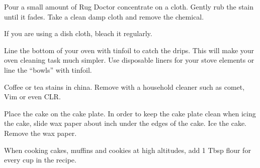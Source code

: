  \par
\begin{minipage}{\linewidth}
Pour a small amount of Rug Doctor concentrate on a cloth. Gently rub the stain until it fades. Take a clean damp cloth and remove the chemical.
\end{minipage}\par

\begin{minipage}{\linewidth}
\end{minipage}\par

\begin{minipage}{\linewidth}
If you are using a dish cloth, bleach it regularly.
\end{minipage}\par

\begin{minipage}{\linewidth}
Line the bottom of your oven with tinfoil to catch the drips. This will make your oven cleaning task much simpler.
Use disposable liners for your stove elements or line the ``bowls'' with tinfoil.
\end{minipage}\par

\begin{minipage}{\linewidth}
Coffee or tea stains in china. Remove with a household cleaner such as comet, Vim or even CLR.
\end{minipage}\par

 \par
\begin{minipage}{\linewidth}
Place the cake on the cake plate. In order to keep the cake plate clean when icing the cake, slide wax paper about  inch under the edges of the cake. Ice the cake. Remove the wax paper.
\end{minipage}\par

\begin{minipage}{\linewidth}
When cooking cakes, muffins and cookies at high altitudes, add 1 Tbsp flour for every cup in the recipe.
\end{minipage}\par

